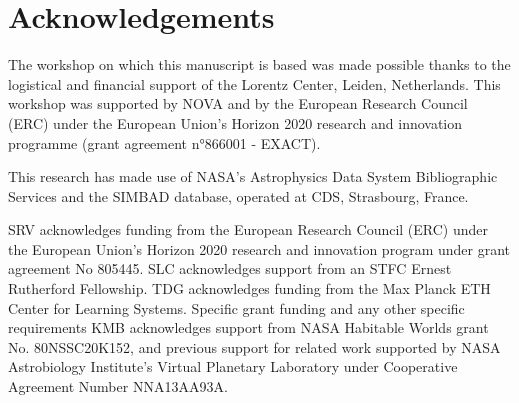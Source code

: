 \documentclass[
    usenatbib,
]{mnras}
\begin{document}
\section*{Acknowledgements}
The workshop on which this manuscript is based was made possible thanks to the logistical and financial support of the Lorentz Center, Leiden, Netherlands. This workshop was supported by NOVA  and by the European Research Council (ERC) under the European Union's Horizon 2020 research and innovation programme (grant agreement n°866001 - EXACT).

This research has made use of NASA's Astrophysics Data System Bibliographic Services and the SIMBAD database, operated at CDS, Strasbourg, France. 

SRV acknowledges funding from the European Research Council (ERC) under the European Union’s Horizon 2020 research and innovation program under grant agreement No 805445.
SLC acknowledges support from an STFC Ernest Rutherford Fellowship. 
TDG acknowledges funding from the Max Planck ETH Center for Learning Systems.
Specific grant funding and any other specific requirements
KMB acknowledges support from NASA Habitable
Worlds grant No. 80NSSC20K152, and previous support for related work supported by NASA Astrobiology Institute's Virtual Planetary Laboratory under Cooperative Agreement Number NNA13AA93A.



\end{document}
